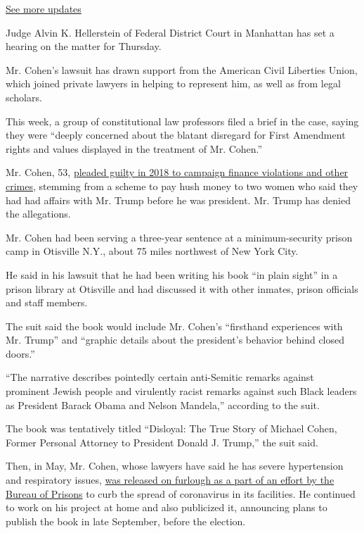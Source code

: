 \href{https://www.nytimes.com/2020/08/03/us/elections/biden-vs-trump.html?action=click\&pgtype=Article\&state=default\&region=MAIN_CONTENT_1\&context=storylines_live_updates}{See
more updates}

Judge Alvin K. Hellerstein of Federal District Court in Manhattan has
set a hearing on the matter for Thursday.

Mr. Cohen's lawsuit has drawn support from the American Civil Liberties
Union, which joined private lawyers in helping to represent him, as well
as from legal scholars.

This week, a group of constitutional law professors filed a brief in the
case, saying they were ``deeply concerned about the blatant disregard
for First Amendment rights and values displayed in the treatment of Mr.
Cohen.''

Mr. Cohen, 53,
\href{https://www.nytimes.com/2018/08/21/nyregion/michael-cohen-guilty-plea-trump-takeaways.html}{pleaded
guilty in 2018 to campaign finance violations and other crimes},
stemming from a scheme to pay hush money to two women who said they had
had affairs with Mr. Trump before he was president. Mr. Trump has denied
the allegations.

Mr. Cohen had been serving a three-year sentence at a minimum-security
prison camp in Otisville N.Y., about 75 miles northwest of New York
City.

He said in his lawsuit that he had been writing his book ``in plain
sight'' in a prison library at Otisville and had discussed it with other
inmates, prison officials and staff members.

The suit said the book would include Mr. Cohen's ``firsthand experiences
with Mr. Trump'' and ``graphic details about the president's behavior
behind closed doors.''

``The narrative describes pointedly certain anti-Semitic remarks against
prominent Jewish people and virulently racist remarks against such Black
leaders as President Barack Obama and Nelson Mandela,'' according to the
suit.

The book was tentatively titled ``Disloyal: The True Story of Michael
Cohen, Former Personal Attorney to President Donald J. Trump,'' the suit
said.

Then, in May, Mr. Cohen, whose lawyers have said he has severe
hypertension and respiratory issues,
\href{https://www.nytimes.com/2020/05/20/nyregion/michael-cohen-coronavirus-prison-release.html}{was
released on furlough as a part of an effort by the Bureau of Prisons} to
curb the spread of coronavirus in its facilities. He continued to work
on his project at home and also publicized it, announcing plans to
publish the book in late September, before the election.

